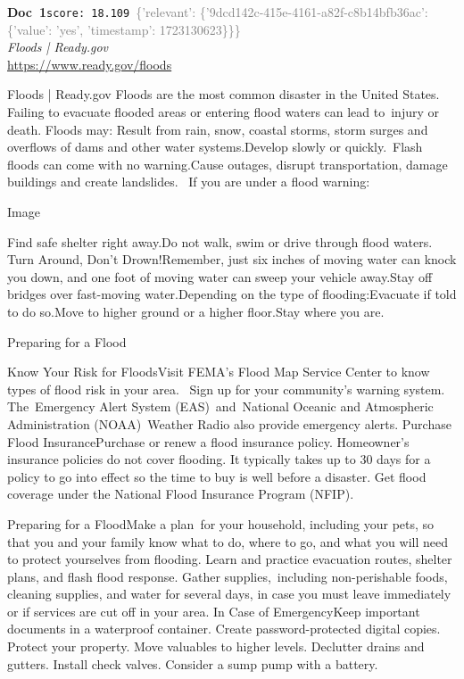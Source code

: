 \documentclass[a4paper,11pt]{article}
\begin{document}
\begin{docenv}
{\footnotesize\textcolor{doccolor}{\textbf{Doc~1}}}\hfill{\tiny\texttt{score:~18.109}}\ {\tiny\textcolor{gray}{\{'relevant': \{'9dcd142c-415e-4161-a82f-c8b14bfb36ac': \{'value': 'yes', 'timestamp': 1723130623\}\}\}}}\\[3pt]
{\small\textit{Floods | Ready.gov}}\\[2pt]
{\tiny\url{https://www.ready.gov/floods}}\\[4pt]
{\footnotesize Floods | Ready.gov
Floods are the most common disaster in the United States. Failing to evacuate flooded areas or entering flood waters can lead to injury or death.
Floods may:
Result from rain, snow, coastal storms, storm surges and overflows of dams and other water systems.Develop slowly or quickly. Flash floods can come with no warning.Cause outages, disrupt transportation, damage buildings and create landslides.
 If you are under a flood warning:

Image
 

Find safe shelter right away.Do not walk, swim or drive through flood waters. Turn Around, Don’t Drown!Remember, just six inches of moving water can knock you down, and one foot of moving water can sweep your vehicle away.Stay off bridges over fast-moving water.Depending on the type of flooding:Evacuate if told to do so.Move to higher ground or a higher floor.Stay where you are.

Preparing for a Flood

Know Your Risk for FloodsVisit FEMA's Flood Map Service Center to know types of flood risk in your area.  Sign up for your community’s warning system. The Emergency Alert System (EAS) and National Oceanic and Atmospheric Administration (NOAA) Weather Radio also provide emergency alerts.
Purchase Flood InsurancePurchase or renew a flood insurance policy. Homeowner’s insurance policies do not cover flooding. It typically takes up to 30 days for a policy to go into effect so the time to buy is well before a disaster. Get flood coverage under the National Flood Insurance Program (NFIP).

Preparing for a FloodMake a plan for your household, including your pets, so that you and your family know what to do, where to go, and what you will need to protect yourselves from flooding. Learn and practice evacuation routes, shelter plans, and flash flood response. Gather supplies, including non-perishable foods, cleaning supplies, and water for several days, in case you must leave immediately or if services are cut off in your area.
In Case of EmergencyKeep important documents in a waterproof container. Create password-protected digital copies. Protect your property. Move valuables to higher levels. Declutter drains and gutters. Install check valves. Consider a sump pump with a battery.}
\end{docenv}
\end{document}
